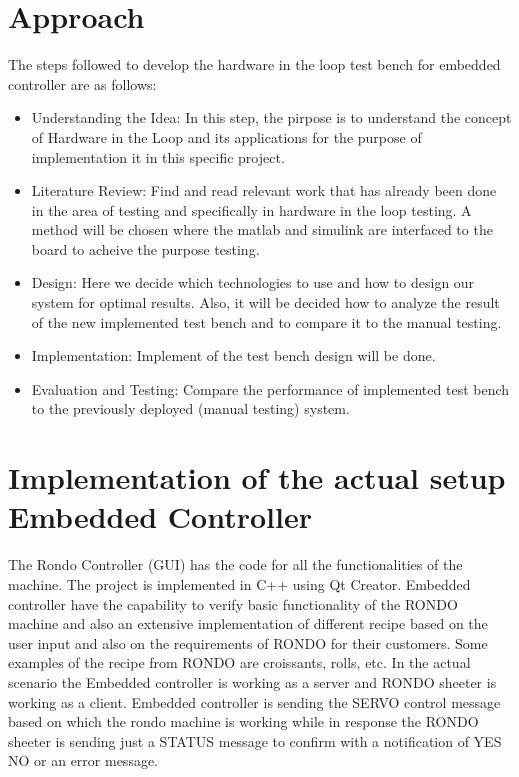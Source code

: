 \documentclass{listhesis}
\begin{document}
\section{Approach}
The steps followed to develop the hardware in the loop test bench for embedded controller are as follows:
\begin{itemize}
  \item Understanding the Idea: In this step, the pirpose is to understand the concept of Hardware in the Loop and its applications for the purpose of implementation it in this specific project. 

  \item Literature Review: Find and read relevant work that has already been done in the area of testing and specifically in hardware in the loop testing. A method will be chosen where the matlab and simulink are interfaced to the board to acheive the purpose testing.

  \item Design: Here we decide which technologies to use and how to design our system for optimal results. Also, it will be decided how to analyze the result of the new implemented test bench and to compare it to the manual testing.

  \item Implementation: Implement of the test bench design will be done.
  \item Evaluation and Testing: Compare the performance of implemented test bench to the previously deployed (manual testing) system.
\end{itemize}





\section{Implementation of the actual setup Embedded Controller}
The Rondo Controller (GUI) has the code for all the functionalities of the machine. The project is implemented in C++ using Qt Creator. Embedded controller have the capability to verify basic functionality of the RONDO machine and also an extensive implementation of different recipe based on the user input and also on the requirements of RONDO for their customers. Some examples of the recipe from RONDO are croissants, rolls, etc. In the actual scenario the Embedded controller is working as a server and RONDO sheeter is working as a client.
Embedded controller is sending the SERVO control message based on which the rondo machine is working while in response the RONDO sheeter is sending just a STATUS message to confirm with a notification of YES NO or an error message. 
\end{document}
